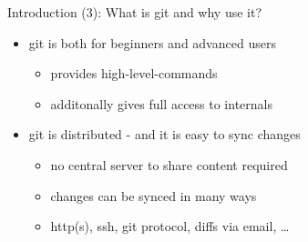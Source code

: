 \begin{frame}{Introduction (3): What is git and why use it?}
  \begin{itemize}
    \item git is both for beginners and advanced users
    \begin{itemize}
      \item provides high-level-commands
      \item additonally gives full access to internals
    \end{itemize}
    \item git is distributed - and it is easy to sync changes
    \begin{itemize}
      \item no central server to share content required
      \item changes can be synced in many ways
      \item http(s), ssh, git protocol, diffs via email, \dots
    \end{itemize}
  \end{itemize}
\end{frame}